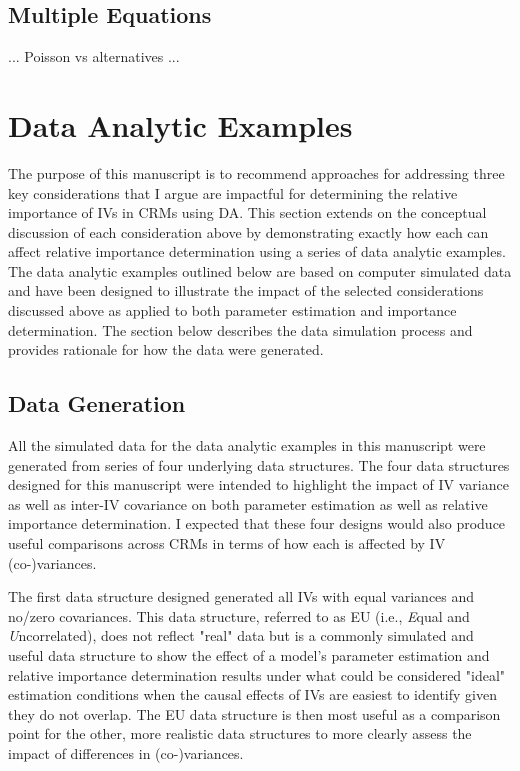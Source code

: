 \documentclass[ShortAfour,times,sageapa]{sagej}
\begin{document}
	
	\subsection{Multiple Equations}
	
	... Poisson vs alternatives ...
	
\section{Data Analytic Examples}
	
	The purpose of this manuscript is to recommend approaches for addressing three key considerations that I argue are impactful for determining the relative importance of IVs in CRMs using DA.
	This section extends on the conceptual discussion of each consideration above by demonstrating exactly how each can affect relative importance determination using a series of data analytic examples. 
	The data analytic examples outlined below are based on computer simulated data and have been designed to illustrate the impact of the selected considerations discussed above as applied to both parameter estimation and importance determination.
	The section below describes the data simulation process and provides rationale for how the data were generated.
	
	\subsection{Data Generation}
	
	All the simulated data for the data analytic examples in this manuscript were generated from series of four underlying data structures.
	The four data structures designed for this manuscript were intended to highlight the impact of IV variance as well as inter-IV covariance on both parameter estimation as well as relative importance determination.
	I expected that these four designs would also produce useful comparisons across CRMs in terms of how each is affected by IV (co-)variances.
	
	The first data structure designed generated all IVs with equal variances and no/zero covariances.  
	This data structure, referred to as EU (i.e., \emph{E}qual and \emph{U}ncorrelated), does not reflect "real" data but is a commonly simulated and useful data structure to show the effect of a model's parameter estimation and relative importance determination results under what could be considered "ideal" estimation conditions when the causal effects of IVs are easiest to identify given they do not overlap.  
	The EU data structure is then most useful as a comparison point for the other, more realistic data structures to more clearly assess the impact of differences in (co-)variances.
	
\end{document}
